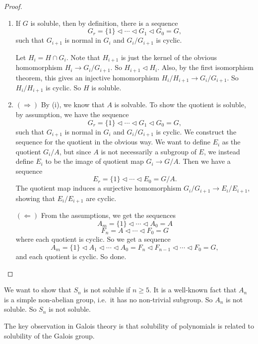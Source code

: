 \documentclass[a4paper]{article}
\begin{document}
\begin{proof}\leavevmode
  \begin{enumerate}
    \item If $G$ is soluble, then by definition, there is a sequence
      \[
        G_r = \{1\} \lhd \cdots \lhd G_1 \lhd G_0 = G,
      \]
      such that $G_{i + 1}$ is normal in $G_i$ and $G_i/G_{i + 1}$ is cyclic.

      Let $H_i = H \cap G_i$. Note that $H_{i + 1}$ is just the kernel of the obvious homomorphism $H_i \to G_i/G_{i + 1}$. So $H_{i + 1} \lhd H_i$. Also, by the first isomorphism theorem, this gives an injective homomorphism $H_i/H_{i + 1} \to G_i/G_{i + 1}$. So $H_i/H_{i + 1}$ is cyclic. So $H$ is soluble.

    \item $(\Rightarrow)$ By (i), we know that $A$ is solvable. To show the quotient is soluble, by assumption, we have the sequence
      \[
        G_r = \{1\} \lhd \cdots \lhd G_1 \lhd G_0 = G,
      \]
      such that $G_{i + 1}$ is normal in $G_i$ and $G_i/G_{i + 1}$ is cyclic. We construct the sequence for the quotient in the obvious way. We want to define $E_i$ as the quotient $G_i/A$, but since $A$ is not necessarily a subgroup of $E$, we instead define $E_i$ to be the image of quotient map $G_i \to G/A$. Then we have a sequence
      \[
        E_r = \{1\} \lhd \cdots \lhd E_0 = G/A.
      \]
      The quotient map induces a surjective homomorphism $G_i/G_{i + 1} \to E_i/E_{i + 1}$, showing that $E_i/E_{i + 1}$ are cyclic.

      $(\Leftarrow)$ From the assumptions, we get the sequences
      \[
        A_m = \{1\} \lhd \cdots \lhd A_0 = A
      \]
      \[
        F_n = A \lhd \cdots \lhd F_0 = G
      \]
      where each quotient is cyclic. So we get a sequence
      \[
        A_m = \{1\} \lhd A_1 \lhd \cdots \lhd A_0 = F_n \lhd F_{n - 1} \lhd \cdots \lhd F_0 = G,
      \]
      and each quotient is cyclic. So done.
  \end{enumerate}
\end{proof}

\begin{eg}
  We want to show that $S_n$ is not soluble if $n \geq 5$. It is a well-known fact that $A_n$ is a simple non-abelian group, i.e.\ it has no non-trivial subgroup. So $A_n$ is not soluble. So $S_n$ is not soluble.
\end{eg}

The key observation in Galois theory is that solubility of polynomials is related to solubility of the Galois group.
\end{document}
